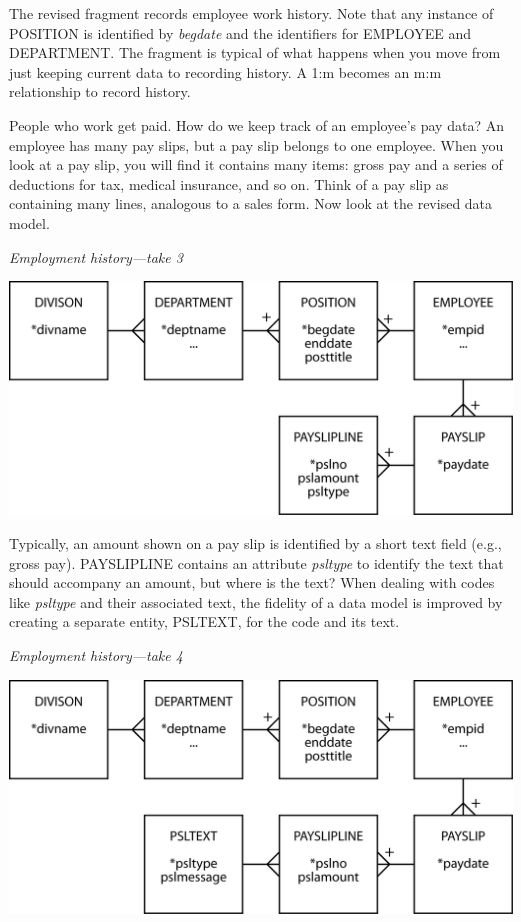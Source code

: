 \documentclass[
]{article}
\begin{document}
The revised fragment records employee work history. Note that any
instance of POSITION is identified by \emph{begdate} and the identifiers for
EMPLOYEE and DEPARTMENT. The fragment is typical of what happens when
you move from just keeping current data to recording history. A 1:m
becomes an m:m relationship to record history.

People who work get paid. How do we keep track of an employee's pay
data? An employee has many pay slips, but a pay slip belongs to one
employee. When you look at a pay slip, you will find it contains many
items: gross pay and a series of deductions for tax, medical insurance,
and so on. Think of a pay slip as containing many lines, analogous to a
sales form. Now look at the revised data model.

\emph{Employment history---take 3}

\includegraphics{Figures/Chapter 7/history-3.png}

Typically, an amount shown on a pay slip is identified by a short text
field (e.g., gross pay). PAYSLIPLINE contains an attribute \emph{psltype} to
identify the text that should accompany an amount, but where is the
text? When dealing with codes like \emph{psltype} and their associated text,
the fidelity of a data model is improved by creating a separate entity,
PSLTEXT, for the code and its text.

\emph{Employment history---take 4}

\includegraphics{Figures/Chapter 7/history-4.png}
\end{document}
